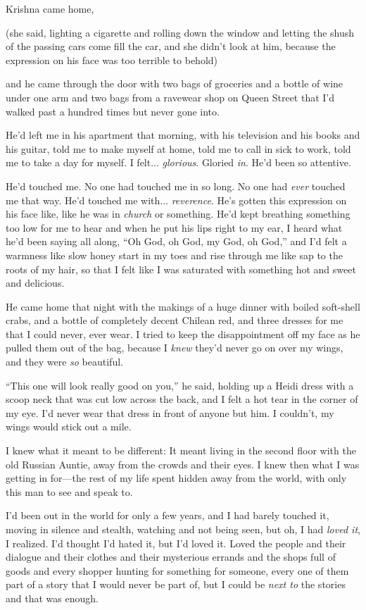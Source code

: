 Krishna came home,

(she said, lighting a cigarette and rolling down the window and
letting the shush of the passing cars come fill the car, and she
didn't look at him, because the expression on his face was too
terrible to behold)

and he came through the door with two bags of groceries and a bottle
of wine under one arm and two bags from a ravewear shop on Queen
Street that I'd walked past a hundred times but never gone into.

He'd left me in his apartment that morning, with his television and
his books and his guitar, told me to make myself at home, told me to
call in sick to work, told me to take a day for myself.  I felt... 
\textit{glorious}.  Gloried \textit{in}.  He'd been so attentive.

He'd touched me.  No one had touched me in so long.  No one had
\textit{ever} touched me that way.  He'd touched me with... 
\textit{reverence}.  He's gotten this expression on his face like,
like he was in \textit{church} or something.  He'd kept breathing
something too low for me to hear and when he put his lips right to my
ear, I heard what he'd been saying all along, ``Oh God, oh God, my
God, oh God,'' and I'd felt a warmness like slow honey start in my
toes and rise through me like sap to the roots of my hair, so that I
felt like I was saturated with something hot and sweet and delicious.

He came home that night with the makings of a huge dinner with boiled
soft-shell crabs, and a bottle of completely decent Chilean red, and
three dresses for me that I could never, ever wear.  I tried to keep
the disappointment off my face as he pulled them out of the bag,
because I \textit{knew} they'd never go on over my wings, and they
were \textit{so} beautiful.

``This one will look really good on you,'' he said, holding up a Heidi
dress with a scoop neck that was cut low across the back, and I felt a
hot tear in the corner of my eye.  I'd never wear that dress in front
of anyone but him.  I couldn't, my wings would stick out a mile.

I knew what it meant to be different:  It meant living in the second
floor with the old Russian Auntie, away from the crowds and their
eyes.  I knew then what I was getting in for---the rest of my life
spent hidden away from the world, with only this man to see and speak
to.

I'd been out in the world for only a few years, and I had barely
touched it, moving in silence and stealth, watching and not being
seen, but oh, I had \textit{loved it}, I realized.  I'd thought I'd
hated it, but I'd loved it.  Loved the people and their dialogue and
their clothes and their mysterious errands and the shops full of goods
and every shopper hunting for something for someone, every one of them
part of a story that I would never be part of, but I could be
\textit{next to} the stories and that was enough.

